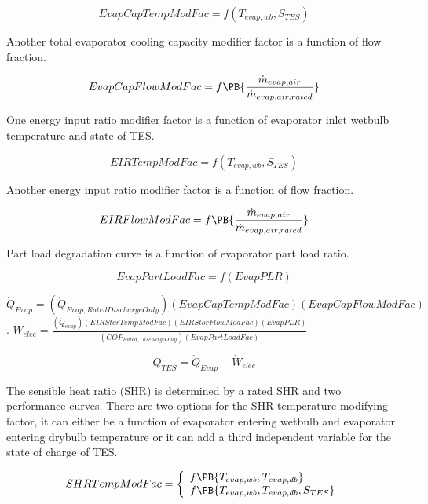 \begin{equation}
EvapCapTempModFac = f\left( {{T_{evap,wb}},{S_{TES}}} \right)
\end{equation}

Another total evaporator cooling capacity modifier factor is a function of flow fraction.

\begin{equation}
EvapCapFlowModFac = f\PB{\frac{\dot{m}_{evap,air}}{\dot{m}_{evap,air,rated}}}
\end{equation}

One energy input ratio modifier factor is a function of evaporator inlet wetbulb temperature and state of TES.

\begin{equation}
EIRTempModFac = f\left( {{T_{evap,wb}},{S_{TES}}} \right)
\end{equation}

Another energy input ratio modifier factor is a function of flow fraction.

\begin{equation}
EIRFlowModFac = f\PB{\frac{\dot{m}_{evap,air}}{\dot{m}_{evap,air,rated}}}
\end{equation}

Part load degradation curve is a function of evaporator part load ratio.

\begin{equation}
EvapPartLoadFac = f\left( {EvapPLR} \right)
\end{equation}

\({\dot Q_{Evap}} = \left( {{{\dot Q}_{Evap,RatedDischargeOnly}}} \right)\left( {EvapCapTempModFac} \right)\left( {EvapCapFlowModFac} \right)\) . \({\dot W_{elec}} = \frac{{\left( {{{\dot Q}_{evap}}} \right)\left( {EIRStorTempModFac} \right)\left( {EIRStorFlowModFac} \right)\left( {EvapPLR} \right)}}{{\left( {CO{P_{Rated,DischargeOnly}}} \right)\left( {EvapPartLoadFac} \right)}}\)

\begin{equation}
{\dot Q_{TES}} = {\dot Q_{Evap}} + {\dot W_{elec}}
\end{equation}

The sensible heat ratio (SHR) is determined by a rated SHR and two performance curves. There are two options for the SHR temperature modifying factor, it can either be a function of evaporator entering wetbulb and evaporator entering drybulb temperature or it can add a third independent variable for the state of charge of TES.

\begin{equation}
  SHRTempModFac = \left\{
    \begin{array}{l}
      f\PB{T_{evap,wb},T_{evap,db}} \\
      f\PB{T_{evap,wb},T_{evap,db},S_{TES}}
    \end{array}
  \right.
\end{equation}

